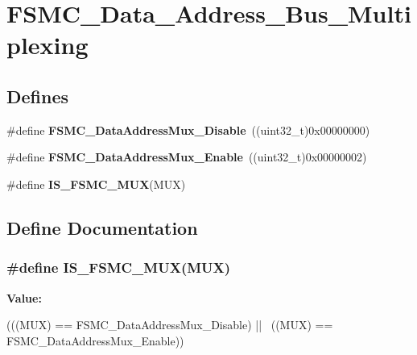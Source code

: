 \hypertarget{group__FSMC__Data__Address__Bus__Multiplexing}{
\section{FSMC\_\-Data\_\-Address\_\-Bus\_\-Multiplexing}
\label{group__FSMC__Data__Address__Bus__Multiplexing}
}
\subsection*{Defines}
\begin{DoxyCompactItemize}
\item 
\hypertarget{group__FSMC__Data__Address__Bus__Multiplexing_ga62d92adbcbcc1d6ec9a04de1b343744a}{
\#define {\bfseries FSMC\_\-DataAddressMux\_\-Disable}~((uint32\_\-t)0x00000000)}
\label{group__FSMC__Data__Address__Bus__Multiplexing_ga62d92adbcbcc1d6ec9a04de1b343744a}

\item 
\hypertarget{group__FSMC__Data__Address__Bus__Multiplexing_ga1dd4d12e63aaf29dbb8ae4b613f2aa15}{
\#define {\bfseries FSMC\_\-DataAddressMux\_\-Enable}~((uint32\_\-t)0x00000002)}
\label{group__FSMC__Data__Address__Bus__Multiplexing_ga1dd4d12e63aaf29dbb8ae4b613f2aa15}

\item 
\#define {\bfseries IS\_\-FSMC\_\-MUX}(MUX)
\end{DoxyCompactItemize}


\subsection{Define Documentation}
\hypertarget{group__FSMC__Data__Address__Bus__Multiplexing_ga546fcab8c1b751b4a959ba2ce5b35d79}{
\subsubsection[{IS\_\-FSMC\_\-MUX}]{\setlength{\rightskip}{0pt plus 5cm}\#define IS\_\-FSMC\_\-MUX(MUX)}}
\label{group__FSMC__Data__Address__Bus__Multiplexing_ga546fcab8c1b751b4a959ba2ce5b35d79}
{\bfseries Value:}
\begin{DoxyCode}
(((MUX) == FSMC_DataAddressMux_Disable) || \
                          ((MUX) == FSMC_DataAddressMux_Enable))
\end{DoxyCode}
